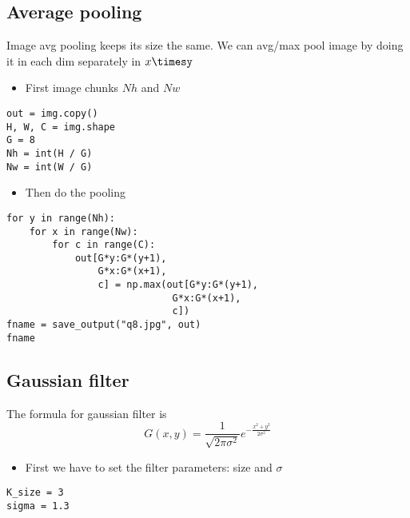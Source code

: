 \documentclass[letterpaper, 11pt]{article}
\begin{document}
\subsection{Average pooling}
\label{sec:orga7f995b}
Image avg pooling keeps its size the same.
We can avg/max pool image by doing it in each dim separately in \(x\timesy\)
\begin{itemize}
\item First image chunks \(Nh\) and \(Nw\)
\end{itemize}
\begin{verbatim}
out = img.copy()
H, W, C = img.shape
G = 8
Nh = int(H / G)
Nw = int(W / G)
\end{verbatim}

\begin{itemize}
\item Then do the pooling
\end{itemize}
\begin{verbatim}
for y in range(Nh):
    for x in range(Nw):
        for c in range(C):
            out[G*y:G*(y+1),
                G*x:G*(x+1),
                c] = np.max(out[G*y:G*(y+1),
                             G*x:G*(x+1),
                             c])
fname = save_output("q8.jpg", out)
fname
\end{verbatim}
\subsection{Gaussian filter}
\label{sec:orge3d8d86}
The formula for gaussian filter is
\[G(x, y) = \frac{1}{\sqrt{2\pi\sigma^{2}}}e^{-\frac{x^{2}+y^{2}}{2\sigma^{2}}}\]
\begin{itemize}
\item First we have to set the filter parameters: size and \(\sigma\)
\end{itemize}
\begin{verbatim}
K_size = 3
sigma = 1.3
\end{verbatim}
\end{document}

